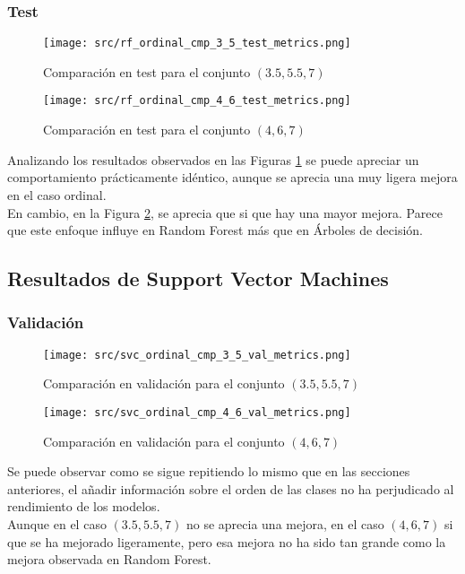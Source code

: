 \subsubsection*{Test}
\begin{figure}[H]
	\centering
	\texttt{[image: src/rf\_ordinal\_cmp\_3\_5\_test\_metrics.png]}
	\caption{Comparación en test para el conjunto  $(3.5,5.5,7)$}
	\label{fig:rf_ordin_test_cmp_1}
\end{figure}
\begin{figure}[H]
	\centering
	\texttt{[image: src/rf\_ordinal\_cmp\_4\_6\_test\_metrics.png]}
	\caption{Comparación en test para el conjunto  $(4,6,7)$}
	\label{fig:rf_ordin_test_cmp_2}
\end{figure}
Analizando los resultados observados en las Figuras \ref{fig:rf_ordin_test_cmp_1} se puede apreciar un comportamiento prácticamente idéntico, aunque se aprecia una muy ligera mejora en el caso ordinal.\\
En cambio, en la Figura \ref{fig:rf_ordin_test_cmp_2}, se aprecia que si que hay una mayor mejora. Parece que este enfoque influye en Random Forest más que en Árboles de decisión.
\clearpage
\subsection{Resultados de Support Vector Machines}
\label{sec:ord_cmp_svm}
\subsubsection*{Validación}
\begin{figure}[H]
	\centering
	\texttt{[image: src/svc\_ordinal\_cmp\_3\_5\_val\_metrics.png]}
	\caption{Comparación en validación para el conjunto  $(3.5,5.5,7)$ }
	\label{fig:svc_ordin_val_cmp_1}
\end{figure}
\begin{figure}[H]
	\centering
	\texttt{[image: src/svc\_ordinal\_cmp\_4\_6\_val\_metrics.png]}
	\caption{Comparación en validación para el conjunto $(4,6,7)$}
	\label{fig:svc_ordin_val_cmp_2}
\end{figure}
Se puede observar como se sigue repitiendo lo mismo que en las secciones anteriores, el añadir información sobre el orden de las clases no ha perjudicado al rendimiento de los modelos.\\
Aunque en el caso $(3.5,5.5,7)$ no se aprecia una mejora, en el caso $(4,6,7)$ si que se ha mejorado ligeramente, pero esa mejora no ha sido tan grande como la mejora observada en Random Forest.
\clearpage
